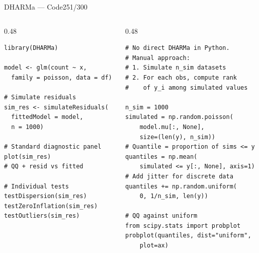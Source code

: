 \documentclass[10pt]{beamer}
\newcommand{\smark}[1]{\hfill{\scriptsize\color{codegray}#1}}
\begin{document}
\begin{frame}[fragile]{DHARMa --- Code}\smark{251/300}
\begin{columns}[T]
\begin{column}{0.48\textwidth}
\begin{lstlisting}[style=Rstyle]
library(DHARMa)

model <- glm(count ~ x,
  family = poisson, data = df)

# Simulate residuals
sim_res <- simulateResiduals(
  fittedModel = model,
  n = 1000)

# Standard diagnostic panel
plot(sim_res)
# QQ + resid vs fitted

# Individual tests
testDispersion(sim_res)
testZeroInflation(sim_res)
testOutliers(sim_res)
\end{lstlisting}
\end{column}
\begin{column}{0.48\textwidth}
\begin{lstlisting}[style=Pystyle]
# No direct DHARMa in Python.
# Manual approach:
# 1. Simulate n_sim datasets
# 2. For each obs, compute rank
#    of y_i among simulated values

n_sim = 1000
simulated = np.random.poisson(
    model.mu[:, None],
    size=(len(y), n_sim))
# Quantile = proportion of sims <= y
quantiles = np.mean(
    simulated <= y[:, None], axis=1)
# Add jitter for discrete data
quantiles += np.random.uniform(
    0, 1/n_sim, len(y))

# QQ against uniform
from scipy.stats import probplot
probplot(quantiles, dist="uniform",
    plot=ax)
\end{lstlisting}
\end{column}
\end{columns}
\end{frame}
\end{document}
